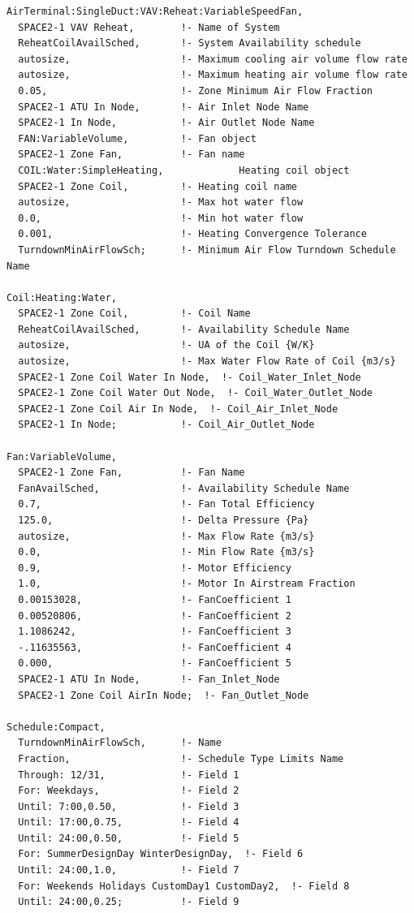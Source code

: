 \begin{lstlisting}
AirTerminal:SingleDuct:VAV:Reheat:VariableSpeedFan,
  SPACE2-1 VAV Reheat,        !- Name of System
  ReheatCoilAvailSched,       !- System Availability schedule
  autosize,                   !- Maximum cooling air volume flow rate
  autosize,                   !- Maximum heating air volume flow rate
  0.05,                       !- Zone Minimum Air Flow Fraction
  SPACE2-1 ATU In Node,       !- Air Inlet Node Name
  SPACE2-1 In Node,           !- Air Outlet Node Name
  FAN:VariableVolume,         !- Fan object
  SPACE2-1 Zone Fan,          !- Fan name
  COIL:Water:SimpleHeating,             Heating coil object
  SPACE2-1 Zone Coil,         !- Heating coil name
  autosize,                   !- Max hot water flow
  0.0,                        !- Min hot water flow
  0.001,                      !- Heating Convergence Tolerance
  TurndownMinAirFlowSch;      !- Minimum Air Flow Turndown Schedule Name

Coil:Heating:Water,
  SPACE2-1 Zone Coil,         !- Coil Name
  ReheatCoilAvailSched,       !- Availability Schedule Name
  autosize,                   !- UA of the Coil {W/K}
  autosize,                   !- Max Water Flow Rate of Coil {m3/s}
  SPACE2-1 Zone Coil Water In Node,  !- Coil_Water_Inlet_Node
  SPACE2-1 Zone Coil Water Out Node,  !- Coil_Water_Outlet_Node
  SPACE2-1 Zone Coil Air In Node,  !- Coil_Air_Inlet_Node
  SPACE2-1 In Node;           !- Coil_Air_Outlet_Node

Fan:VariableVolume,
  SPACE2-1 Zone Fan,          !- Fan Name
  FanAvailSched,              !- Availability Schedule Name
  0.7,                        !- Fan Total Efficiency
  125.0,                      !- Delta Pressure {Pa}
  autosize,                   !- Max Flow Rate {m3/s}
  0.0,                        !- Min Flow Rate {m3/s}
  0.9,                        !- Motor Efficiency
  1.0,                        !- Motor In Airstream Fraction
  0.00153028,                 !- FanCoefficient 1
  0.00520806,                 !- FanCoefficient 2
  1.1086242,                  !- FanCoefficient 3
  -.11635563,                 !- FanCoefficient 4
  0.000,                      !- FanCoefficient 5
  SPACE2-1 ATU In Node,       !- Fan_Inlet_Node
  SPACE2-1 Zone Coil AirIn Node;  !- Fan_Outlet_Node

Schedule:Compact,
  TurndownMinAirFlowSch,      !- Name
  Fraction,                   !- Schedule Type Limits Name
  Through: 12/31,             !- Field 1
  For: Weekdays,              !- Field 2
  Until: 7:00,0.50,           !- Field 3
  Until: 17:00,0.75,          !- Field 4
  Until: 24:00,0.50,          !- Field 5
  For: SummerDesignDay WinterDesignDay,  !- Field 6
  Until: 24:00,1.0,           !- Field 7
  For: Weekends Holidays CustomDay1 CustomDay2,  !- Field 8
  Until: 24:00,0.25;          !- Field 9
\end{lstlisting}

